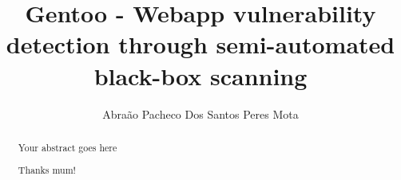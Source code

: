 \documentclass[a4paper, twoside]{report}
\title{Gentoo - Webapp vulnerability detection through semi-automated black-box scanning}
\author{Abra\~{a}o Pacheco Dos Santos Peres Mota}
\begin{document}


\begin{abstract}

	
Your abstract goes here
\end{abstract}


\clearpage{\pagestyle{fancy}\cleardoublepage}

\renewcommand{\abstractname}{Acknowledgements}
\begin{abstract}
Thanks mum!
\end{abstract}

\tableofcontents






%

%





\end{document}
